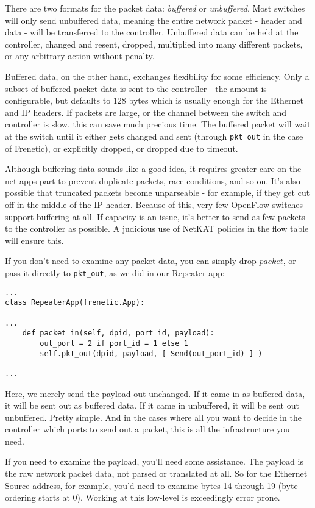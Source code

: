 \bigskip
There are two formats for the packet data: \emph{buffered} or \emph{unbuffered}.
Most switches will only send unbuffered data, meaning the entire network packet - header and data - will be 
transferred to the controller.
Unbuffered data can be held at the controller, changed and resent, dropped, multiplied into many different packets, or 
any arbitrary action without penalty.  

Buffered data, on the other hand, exchanges flexibility for some efficiency.
Only a subset of buffered packet data is sent to the controller - the amount is configurable, but defaults to 128 bytes which is usually enough for the Ethernet and IP headers.  
If packets are large, or the channel between the switch and controller is slow, this can save much precious time.
The buffered packet will wait at the switch until it either gets changed and sent (through \texttt{pkt\_out} in 
the case of Frenetic), or explicitly dropped, or dropped due to timeout.  

Although buffering data sounds like a good idea, it requires greater care on the net apps part to prevent
duplicate packets, race conditions, and so on.
It's also possible that truncated packets become unparseable - for example, if they get cut off in the middle of
the IP header.
Because of this, very few OpenFlow switches support buffering at all.  
If capacity is an issue, it's better to send as few packets to the controller as possible.
A judicious use of NetKAT policies in the flow table will ensure this.  

If you don't need to examine any packet data, you can simply drop $packet$, or pass it directly to \texttt{pkt\_out},
as we did in our Repeater app:

\begin{lstlisting}
...
class RepeaterApp(frenetic.App):

...
    def packet_in(self, dpid, port_id, payload):
        out_port = 2 if port_id = 1 else 1
        self.pkt_out(dpid, payload, [ Send(out_port_id) ] )

...
\end{lstlisting}

Here, we merely send the payload out unchanged.  
If it came in as buffered data, it will be sent out as buffered data.
If it came in unbuffered, it will be sent out unbuffered.  
Pretty simple.
And in the cases where all you want to decide in the controller which ports to send out a packet, this
is all the infrastructure you need.

If you need to examine the payload, you'll need some assistance.
The payload is the raw network packet data, not parsed or translated at all.
So for the Ethernet Source address, for example, you'd need to examine bytes 14 through 19 
(byte ordering starts at 0).  
Working at this low-level is exceedingly error prone.

